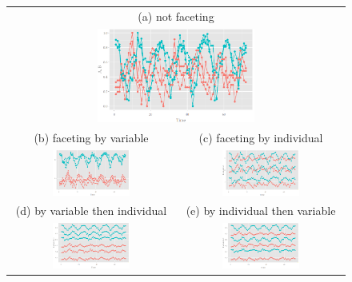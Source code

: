 \documentclass[12pt]{article}
\providecommand{\tabularnewline}{\\}
\begin{document}
\begin{itemize}
\begin{center}
\begin{figure}[htp]
\begin{centering}
\begin{tabular}{cc}
\multicolumn{2}{c}{{\scriptsize{ (a) not faceting}}}\tabularnewline
\multicolumn{2}{c}{\includegraphics[width=0.48\textwidth]{graph/pipeline-14-1}}\tabularnewline
{\scriptsize{ (b) faceting by variable}} & {\scriptsize{ (c) faceting by individual}}\tabularnewline
\includegraphics[width=0.48\textwidth]{graph/pipeline-14-2} & \includegraphics[width=0.48\textwidth]{graph/pipeline-14-3}\tabularnewline
{\scriptsize{ (d) by variable then individual}} & {\scriptsize{ (e) by individual then variable}}\tabularnewline
\includegraphics[width=0.48\textwidth]{graph/pipeline-14-4} & \includegraphics[width=0.48\textwidth]{graph/pipeline-14-5}\tabularnewline
\end{tabular}
\end{centering}


\end{figure}
\end{center}
\end{itemize}
\end{document}
